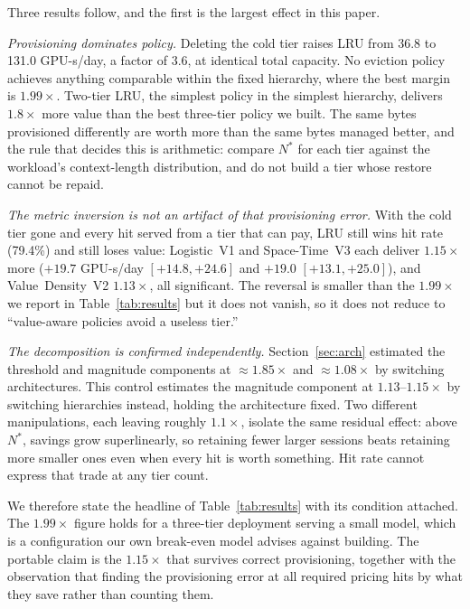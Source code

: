 \documentclass[letterpaper,twocolumn,10pt]{article}
\begin{document}
Three results follow, and the first is the largest effect in this paper.

\emph{Provisioning dominates policy.} Deleting the cold tier raises LRU from 36.8 to 131.0
GPU-s/day, a factor of $3.6$, at identical total capacity. No eviction policy achieves
anything comparable within the fixed hierarchy, where the best margin is $1.99\times$.
Two-tier LRU, the simplest policy in the simplest hierarchy, delivers $1.8\times$ more value
than the best three-tier policy we built. The same bytes provisioned differently are worth
more than the same bytes managed better, and the rule that decides this is arithmetic:
compare $N^{*}$ for each tier against the workload's context-length distribution, and do not
build a tier whose restore cannot be repaid.

\emph{The metric inversion is not an artifact of that provisioning error.} With the cold
tier gone and every hit served from a tier that can pay, LRU still wins hit rate (79.4\%)
and still loses value: Logistic~V1 and Space-Time~V3 each deliver $1.15\times$ more
($+19.7$ GPU-s/day $[+14.8, +24.6]$ and $+19.0$ $[+13.1, +25.0]$), and Value~Density~V2
$1.13\times$, all significant. The reversal is smaller than the $1.99\times$ we report in
Table~\ref{tab:results} but it does not vanish, so it does not reduce to ``value-aware
policies avoid a useless tier.''

\emph{The decomposition is confirmed independently.} Section~\ref{sec:arch} estimated the
threshold and magnitude components at ${\approx}1.85\times$ and ${\approx}1.08\times$ by
switching architectures. This control estimates the magnitude component at
$1.13$--$1.15\times$ by switching hierarchies instead, holding the architecture fixed. Two
different manipulations, each leaving roughly $1.1\times$, isolate the same residual effect:
above $N^{*}$, savings grow superlinearly, so retaining fewer larger sessions beats
retaining more smaller ones even when every hit is worth something. Hit rate cannot express
that trade at any tier count.

We therefore state the headline of Table~\ref{tab:results} with its condition attached. The
$1.99\times$ figure holds for a three-tier deployment serving a small model, which is a
configuration our own break-even model advises against building. The portable claim is the
$1.15\times$ that survives correct provisioning, together with the observation that finding
the provisioning error at all required pricing hits by what they save rather than counting
them.
\end{document}
